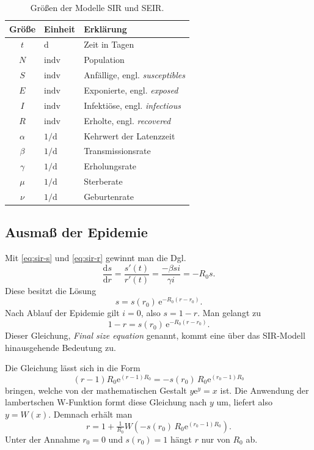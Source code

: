 \documentclass[a4paper,10pt,fleqn,twocolumn,twoside,dvipdfmx]{scrartcl}
\numberwithin{equation}{section}
\newcommand{\ee}{\mathrm e}
\newcommand{\unit}[1]{\mathrm{#1}}
\newcommand{\strong}[1]{{\sffamily\bfseries #1}}
\begin{document}
\begin{table}
\begin{tabular}{cll}
\toprule
\strong{Größe} & \strong{Einheit} & \strong{Erklärung}\\
\midrule
$t$ & $\unit{d}$ & Zeit in Tagen\\
$N$ & $\unit{indv}$ & Population\\
$S$ & $\unit{indv}$ & Anfällige, engl. \emph{susceptibles}\\
$E$ & $\unit{indv}$ & Exponierte, engl. \emph{exposed}\\
$I$ & $\unit{indv}$ & Infektiöse, engl. \emph{infectious}\\
$R$ & $\unit{indv}$ & Erholte, engl. \emph{recovered}\\
$\alpha$ & $1/\unit d$ & Kehrwert der Latenzzeit\\
$\beta$ & $1/\unit d$ & Transmissionsrate\\
$\gamma$ & $1/\unit d$ & Erholungsrate\\
$\mu$ & $1/\unit d$ & Sterberate\\
$\nu$ & $1/\unit d$ & Geburtenrate\\
\bottomrule
\end{tabular}
\caption{Größen der Modelle SIR und SEIR.}
\end{table}

\subsection{Ausmaß der Epidemie}

Mit \eqref{eq:sir-s} und \eqref{eq:sir-r} gewinnt man die Dgl.
\begin{equation}\label{eq:ODE-s-r}
\frac{\mathrm ds}{\mathrm dr} = \frac{s'(t)}{r'(t)}
= \frac{-\beta si}{\gamma i} = -R_0 s.
\end{equation}
Diese besitzt die Lösung
\begin{equation}
s = s(r_0)\,\ee^{-R_0 (r-r_0)}.
\end{equation}
Nach Ablauf der Epidemie gilt $i=0$, also $s=1-r$. Man gelangt zu%
\begin{equation}\label{eq:final-size}
1-r = s(r_0)\,\ee^{-R_0 (r-r_0)}.
\end{equation}
Dieser Gleichung, \emph{Final size equation} genannt,
kommt eine über das SIR-Modell hinausgehende Bedeutung zu.

Die Gleichung lässt sich in die Form
\begin{equation}
(r-1)R_0\ee^{(r-1)R_0} = -s(r_0)\,R_0\ee^{(r_0-1)R_0}
\end{equation}
bringen, welche von der mathematischen Gestalt $y\ee^y = x$ ist.
Die Anwendung der lambertschen W-Funktion formt diese Gleichung
nach $y$ um, liefert also $y=W(x)$. Demnach erhält man%
\begin{equation}
r = 1+\tfrac{1}{R_0}W(-s(r_0)\,R_0\ee^{(r_0-1)R_0}).
\end{equation}
Unter der Annahme $r_0=0$ und $s(r_0)=1$ hängt $r$ nur von
$R_0$ ab.
\end{document}
